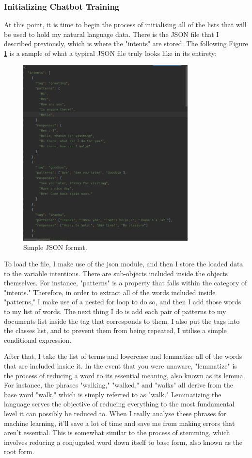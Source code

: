 \subsubsection{Initializing Chatbot Training}
At this point, it is time to begin the process of initialising all of the lists that will be used to hold my natural language data. There is the JSON file that I described previously, which is where the "intents" are stored. The following Figure \ref{fig:9} is a sample of what a typical JSON file truly looks like in its entirety:
\begin{figure}[!h]
	\centering
	\includegraphics[width=0.8\textwidth]{intent}
	\caption{Simple JSON format.}
	\label{fig:9}
\end{figure}

To load the file, I make use of the json module, and then I store the loaded data to the variable intentions. There are sub-objects included inside the objects themselves. For instance, "patterns" is a property that falls within the category of "intents." Therefore, in order to extract all of the words included inside "patterns," I make use of a nested for loop to do so, and then I add those words to my list of words. The next thing I do is add each pair of patterns to my documents list inside the tag that corresponds to them. I also put the tags into the classes list, and to prevent them from being repeated, I utilise a simple conditional expression.

After that, I take the list of terms and lowercase and lemmatize all of the words that are included inside it. In the event that you were unaware, "lemmatize" is the process of reducing a word to its essential meaning, also known as its lemma. For instance, the phrases "walking," "walked," and "walks" all derive from the base word "walk," which is simply referred to as "walk." Lemmatizing the language serves the objective of reducing everything to the most fundamental level it can possibly be reduced to. When I really analyse these phrases for machine learning, it'll save a lot of time and save me from making errors that aren't essential. This is somewhat similar to the process of stemming, which involves reducing a conjugated word down itself to base form, also known as the root form.

